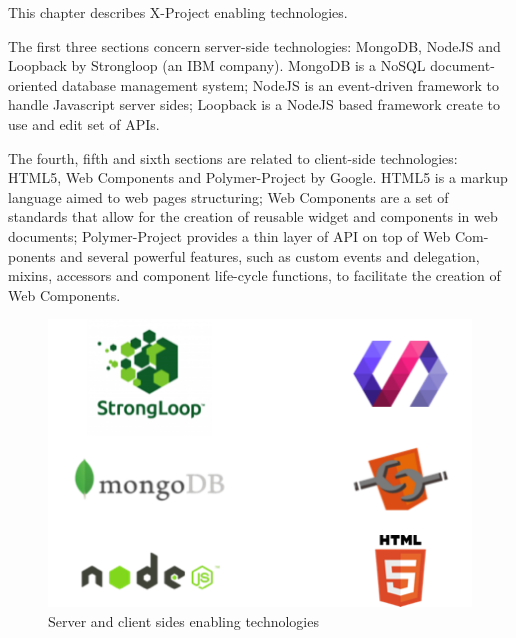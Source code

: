 This chapter describes X-Project enabling technologies.

The first three sections concern server-side technologies: MongoDB, NodeJS and Loopback by Strongloop (an IBM company).
MongoDB is a NoSQL document-oriented database management system; NodeJS is an event-driven framework to handle Javascript server sides; Loopback is a NodeJS based framework create to use and edit set of APIs.

The fourth, fifth and sixth sections are related to client-side technologies: HTML5, Web Components and Polymer-Project by Google.
HTML5 is a markup language aimed to web pages structuring; Web Components are a set of standards that allow for the creation of reusable widget and components in web documents; Polymer-Project provides a thin layer of API on top of Web Com- ponents and several powerful features, such as custom events and delegation, mixins, accessors and component life-cycle functions, to facilitate the creation of Web Components.

\begin {figure}[h]
\graphicspath{{images/chapter_TCH/}}
\includegraphics[width=\textwidth]{stack_tch}
\caption{Server and client sides enabling technologies}
\end {figure}
